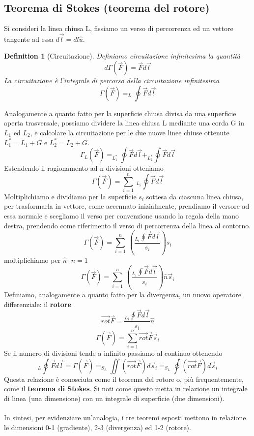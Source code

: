 \documentclass[10pt,a4paper]{article}
\newtheorem{definition}{Definition}
\begin{document}
\subsection{Teorema di Stokes (teorema del rotore)}
Si consideri la linea chiusa L, fissiamo un verso di percorrenza ed un vettore tangente ad essa $d\vec{l}= dl\hat{u}$. 
\begin{definition}[Circuitazione]
	Definiamo circuitazione infinitesima la quantità
	\[d\Gamma(\vec{F}) = \vec{F}d\vec{l}\]
	La circuitazione è l'integrale di percorso della circuitazione infinitesima
	\[\Gamma(\vec{F}) = _L\oint \vec{F}d\vec{l}\]
\end{definition}
Analogamente a quanto fatto per la superficie chiusa divisa da una superficie aperta trasversale, possiamo dividere la linea chiusa L mediante una corda G in \(L_1\) ed \(L_2\), e calcolare la circuitazione per le due nuove linee chiuse ottenute \(L_1^* = L_1+G\) e \(L_2^* = L_2+G\).
\[\Gamma_L(\vec{F}) = _{L_1^*}\oint \vec{F}d\vec{l}+_{L_2^*}\oint \vec{F}d\vec{l} \]
Estendendo il ragionamento ad n divisioni otteniamo
\[\Gamma(\vec{F}) = \sum_{i=1}^{n}\ _{L_i}\oint\vec{F}d\vec{l}\]
Moltiplichiamo e dividiamo per la superficie \(s_i\) sottesa da ciascuna linea chiusa, per trasformarla in vettore, come accennato inizialmente, prendiamo il versore ad essa normale e scegliamo il verso per convenzione usando la regola della mano destra, prendendo come riferimento il verso di percorrenza della linea al contorno.
\[\Gamma(\vec{F}) = \sum_{i=1}^{n}\ \left( \frac{_{L_i}\oint\vec{F}d\vec{l}}{s_i}\right)s_i\]
moltiplichiamo per \(\hat{n}\cdot\hat{n}=1\)
\[\Gamma(\vec{F}) = \sum_{i=1}^{n}\ \left( \frac{_{L_i}\oint\vec{F}d\vec{l}}{s_i}\right)\hat{n}\vec{s}_i\]
Definiamo, analogamente a quanto fatto per la divergenza, un nuovo operatore differenziale: il \textbf{rotore}
\[\vec{rot}\vec{F} = \frac{_{L_i}\oint\vec{F}d\vec{l}}{s_i}\hat{n}\]
\[\Gamma(\vec{F}) = \sum_{i=1}^{n}\vec{rot}\vec{F}\vec{s}_i \]
Se il numero di divisioni tende a infinito passiamo al continuo ottenendo
\[_L\oint\vec{F}d\vec{l} =\Gamma(\vec{F}) = _{S_L}\iint(\vec{rot}\vec{F})d\vec{s}_i =_{S_L}\oint(\vec{rot}\vec{F})d\vec{s}_i\]
Questa relazione è conosciuta come il teorema del rotore o, più frequentemente, come il \textbf{teorema di Stokes}. Si noti come questo metta in relazione un integrale di linea (una dimensione) con un integrale di superficie (due dimensioni).\\\\
In sintesi, per evidenziare un'analogia, i tre teoremi esposti mettono in relazione le dimensioni 0-1 (gradiente), 2-3 (divergenza) ed 1-2 (rotore).
\end{document}
